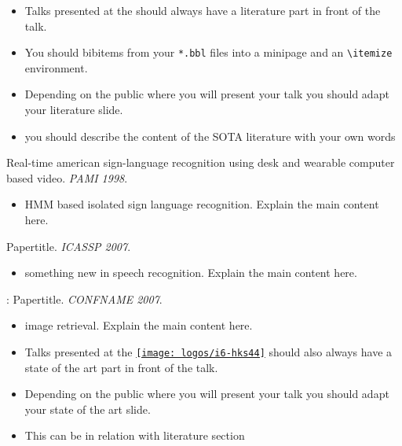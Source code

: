 \documentclass[11pt, a4paper, landscape]{article}
\begin{document}
\NewPage{} 
\vfill
\begin{itemize}
\item Talks presented at the
  \href{http://www-i6.rwth-aachen.de/}{\isechsicon}
  should always have a literature part in front of the talk. 
\item You should  bibitems from your \texttt{*.bbl} files
  into a minipage and an \texttt{\textbackslash itemize} environment.
\item Depending on the public where you will present your talk you should adapt
  your literature slide.
\item you should describe the content of the SOTA literature with your
  own words
\end{itemize}
\vfill 

\NewPage{} 
\vfill 
\begin{description}
\item [T.~Starner, J.~Weaver, A.~Pentland:] Real-time american sign-language
  recognition using desk and wearable computer based video. {\em PAMI 1998}.
  \begin{itemize}
  \item HMM based isolated sign language recognition. Explain the main content here.
  \end{itemize}
\item [Povey:] Papertitle. {\em ICASSP 2007}.
  \begin{itemize}
  \item something new in speech recognition. Explain the main content here.
  \end{itemize}
\item \cite{loupias:_wavel_salien_point_image_retriev}: Papertitle. {\em CONFNAME 2007}.
  \begin{itemize}
  \item image retrieval. Explain the main content here.
  \end{itemize}
\end{description}
\vfill


\NewPage{} 
\vfill 
\begin{itemize}
\item Talks presented at the
  \href{http:://www-i6.rwth-aachen.de/}{\texttt{[image: logos/i6-hks44]}}
  should also always have a state of the art part in front of the talk.
\item Depending on the public where you will present your talk you should
adapt your state of the art slide.
\item This can be in relation with literature section
\end{itemize}
\vfill
\end{document}
